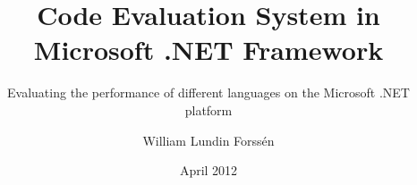 \title{Code Evaluation System in Microsoft .NET Framework}

\subtitle{Evaluating the performance of different languages on the Microsoft .NET platform}


\author{William Lundin Forss\'{e}n}
\date{April 2012}
